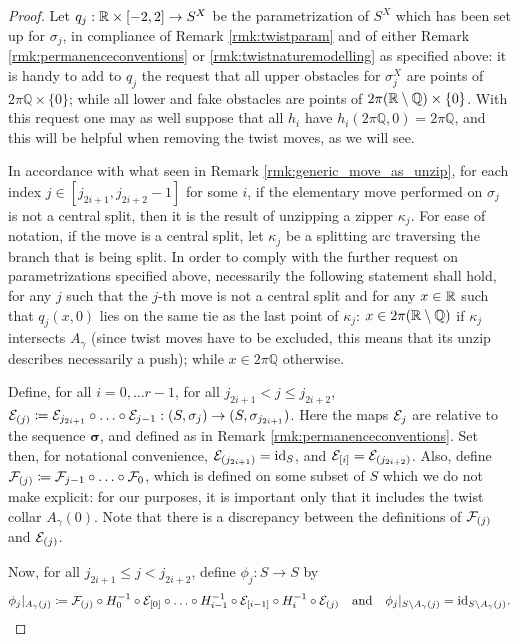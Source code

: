 \begin{proof}
Let $q_j:\mathbb R\times[-2,2]\rightarrow S^X$ be the parametrization of $S^X$ which has been set up for $\sigma_j$, in compliance of Remark \ref{rmk:twistparam} and of either Remark \ref{rmk:permanenceconventions} or \ref{rmk:twistnaturemodelling} as specified above: it is handy to add to $q_j$ the request that all upper obstacles for $\sigma_j^X$ are points of $2\pi\mathbb Q\times\{0\}$; while all lower and fake obstacles are points of $2\pi(\mathbb R\setminus\mathbb Q)\times\{0\}$. With this request one may as well suppose that all $h_i$ have $h_i(2\pi\mathbb Q,0)=2\pi \mathbb Q$, and this will be helpful when removing the twist moves, as we will see.

In accordance with what seen in Remark \ref{rmk:generic_move_as_unzip}, for each index $j\in[j_{2i+1},j_{2i+2}-1]$ for some $i$, if the elementary move performed on $\sigma_j$ is not a central split, then it is the result of unzipping a zipper $\kappa_j$. For ease of notation, if the move is a central split, let $\kappa_j$ be a splitting arc traversing the branch that is being split. In order to comply with the further request on parametrizations specified above, necessarily the following statement shall hold, for any $j$ such that the $j$-th move is not a central split and for any $x\in\mathbb R$ such that $q_j(x,0)$ lies on the same tie as the last point of $\kappa_j$: $x\in 2\pi(\mathbb R\setminus\mathbb Q)$ if $\kappa_j$ intersects $A_\gamma$ (since twist moves have to be excluded, this means that its unzip describes necessarily a push); while $x\in 2\pi\mathbb Q$ otherwise.

Define, for all $i=0,\ldots r-1$, for all $j_{2i+1}< j \leq j_{2i+2}$, $\mathcal{E}_{(j)}\coloneqq  \mathcal{E}_{j_{2i+1}}\circ\ldots\circ\mathcal{E}_{j-1}: (S,\sigma_j)\rightarrow (S,\sigma_{j_{2i+1}})$. Here the maps $\mathcal{E}_j$ are relative to the sequence $\bm\sigma$, and defined as in Remark \ref{rmk:permanenceconventions}. Set then, for notational convenience, $\mathcal{E}_{(j_{2i+1})}=\mathrm{id}_S$, and $\mathcal{E}_{[i]}=\mathcal{E}_{(j_{2i+2})}$. Also, define $\mathcal{F}_{(j)}\coloneqq  \mathcal{F}_{j-1}\circ\ldots\circ\mathcal{F}_0$, which is defined on some subset of $S$ which we do not make explicit: for our purposes, it is important only that it includes the twist collar $A_\gamma(0)$. Note that there is a discrepancy between the definitions of $\mathcal{F}_{(j)}$ and $\mathcal{E}_{(j)}$.

Now, for all $j_{2i+1}\leq j < j_{2i+2}$, define $\phi_j:S\rightarrow S$ by
$$\phi_j|_{A_\gamma(j)}\coloneqq \mathcal{F}_{(j)}\circ H_0^{-1}\circ\mathcal{E}_{[0]}\circ\ldots\circ H_{i-1}^{-1}\circ \mathcal{E}_{[i-1]}\circ H_i^{-1}\circ \mathcal{E}_{(j)}\quad\text{and}\quad \phi_j|_{S\setminus A_\gamma(j)}=\mathrm{id}_{S\setminus A_\gamma(j)}.$$


\end{proof}
